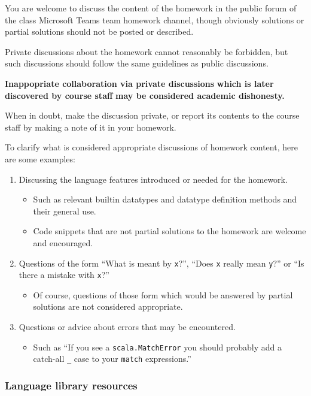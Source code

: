 \documentclass[11pt]{article}
\begin{document}
You are welcome to discuss the content of the homework in
the public forum of the class Microsoft Teams team homework channel,
though obviously solutions or partial solutions should not
be posted or described.

Private discussions about the homework cannot reasonably be
forbidden, but such discussions should follow the same guidelines
as public discussions.

\begin{center}
\textbf{Inappopriate collaboration via private discussions}
\textbf{which is later discovered by course staff}
\textbf{may be considered academic dishonesty.}

When in doubt, make the discussion private, or report its contents
to the course staff by making a note of it
in your homework.
\end{center}

To clarify what is considered appropriate discussions
of homework content, here are some examples:
\begin{enumerate}
\item Discussing the language features introduced or needed for the homework.
\begin{itemize}
\item Such as relevant builtin datatypes
and datatype definition methods and their general use.
\item Code snippets that are not partial solutions to the homework
are welcome and encouraged.
\end{itemize}
\item Questions of the form “What is meant by \texttt{x}?”,
“Does \texttt{x} really mean \texttt{y}?” or “Is there a mistake with \texttt{x}?”
\begin{itemize}
\item Of course, questions of those form which would be answered
by partial solutions are not considered appropriate.
\end{itemize}
\item Questions or advice about errors that may be encountered.
\begin{itemize}
\item Such as “If you see a \texttt{scala.MatchError} you should
probably add a catch-all \texttt{\_} case to your \texttt{match} expressions.”
\end{itemize}
\end{enumerate}

\subsubsection*{Language library resources}
\label{sec:orge167ab0}
\end{document}
